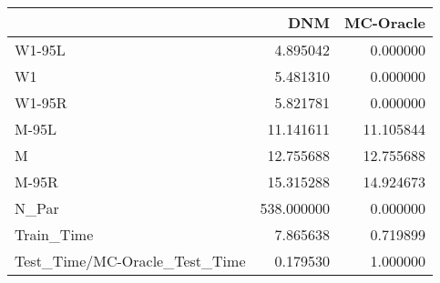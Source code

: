 \begin{tabular}{lrr}
\toprule
{} &         DNM &  MC-Oracle \\
\midrule
W1-95L                        &    4.895042 &   0.000000 \\
W1                            &    5.481310 &   0.000000 \\
W1-95R                        &    5.821781 &   0.000000 \\
M-95L                         &   11.141611 &  11.105844 \\
M                             &   12.755688 &  12.755688 \\
M-95R                         &   15.315288 &  14.924673 \\
N\_Par                         &  538.000000 &   0.000000 \\
Train\_Time                    &    7.865638 &   0.719899 \\
Test\_Time/MC-Oracle\_Test\_Time &    0.179530 &   1.000000 \\
\bottomrule
\end{tabular}
